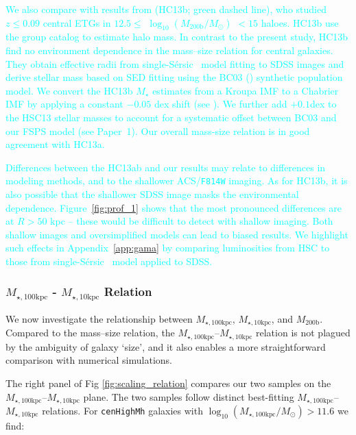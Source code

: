 \documentclass[a4paper,fleqn,usenatbib]{mnras}
\def\ser{{S\'{e}rsic\ }}
\def\rbcg{\texttt{cenHighMh}}
\def\mstar{{$M_{\star}$}}
\def\mhalo{{$M_{\mathrm{200b}}$}}
\def\logmh{{$\log_{10} (M_{\mathrm{200b}}/M_{\odot})$}}
\def\minn{{$M_{\star,10\mathrm{kpc}}$}}
\def\mtot{{$M_{\star,100\mathrm{kpc}}$}}
\def\logmtot{{$\log_{10} (M_{\star,100\mathrm{kpc}}/M_{\odot})$}}
\newcommand{\song}[1]{\textcolor{cyan}{#1}}
\begin{document}
    \song{
    We also compare with results from \citealt{HCompany13} (HC13b; green dashed line), 
    who studied $z\leq 0.09$ central ETGs in $12.5 \le$ \logmh{} $< 15$ haloes. 
    HC13b use the \citet{Yang2007} group catalog to estimate halo mass. 
    In contrast to the present study, HC13b find no environment dependence in the 
    mass--size relation for central galaxies. 
    They obtain effective radii from single-\ser{} model fitting to SDSS 
    images and derive stellar mass based on SED fitting using the BC03 (\citealt{BC03}) 
    synthetic population model. 
    We convert the HC13b \mstar{} estimates from a Kroupa IMF to a Chabrier 
    IMF by applying a constant $-0.05$ dex shift (see \citealt{Bernardi2016a}). 
    We further add $+0.1$dex to the HSC13 stellar masses to account for a systematic 
    offset between BC03 and our FSPS model (see Paper~1). Our overall mass-size relation is in good agreement with HC13a.}
    
    \song{
    Differences between the HC13ab and our results may relate to differences 
    in modeling methods, and to the shallower ACS/\texttt{F814W} imaging. 
    As for HC13b, it is also possible that the shallower SDSS image masks the environmental dependence. Figure~\ref{fig:prof_1} shows that the most pronounced differences are at $R>50$ kpc -- these would be difficult to detect with shallow imaging. Both shallow images and oversimplified models can lead to biased results. We highlight such effects in Appendix~\ref{app:gama} by comparing luminosities from HSC to those from single-\ser{} model applied to SDSS.
    }

    
\subsubsection{\mtot{} - \minn{} Relation}
    \label{sssec:m100_m10}
    
    We now investigate the relationship between \mtot{}, \minn{}, and \mhalo{}. 
    Compared to the mass--size relation, the \mtot{}--\minn{} relation is not plagued 
    by the ambiguity of galaxy `size', and it also enables a more straightforward 
    comparison with numerical simulations.
    
    The right panel of Fig \ref{fig:scaling_relation} compares our two samples on the \mtot{}--\minn{} plane. The two samples follow distinct best-fitting \mtot{}--\minn{} relations. 
    For \rbcg{} galaxies with \logmtot{}$>11.6$ we find:
    
\end{document}
